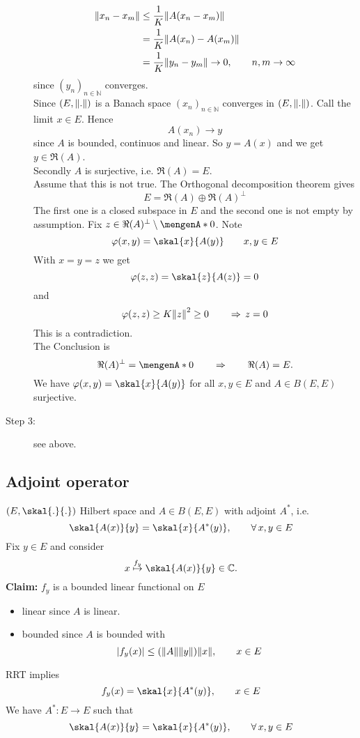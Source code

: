\begin{beweis}
\begin{description}
		\begin{align*}
			\norm{x_n-x_m} &\leq \frac{1}{K} \norm{A(x_n-x_m)} \\
			&= \frac{1}{K} \norm{A(x_n)- A(x_m)} \\
			&= \frac{1}{K} \norm{y_n -y_m} \to 0, \qquad n,m \to \infty
		\end{align*}
		since $(y_n)_{n \in \mathbb{N}}$ converges. \\
		Since $(E, \norm{.})$ is a Banach space $(x_n)_{n \in \mathbb{N}}$ converges in $(E, \norm{.})$. Call the limit $x \in E$. Hence
		\[
			A(x_n) \to y
		\]
		since $A$ is bounded, continuos and linear. So $y = A(x)$ and we get $y \in \Re(A)$. \\
		Secondly $A$ is surjective, i.e. $\Re(A)=E$. \\
		Assume that this is not true. The Orthogonal decomposition theorem gives
		\[
			E = \Re(A) \oplus \Re(A)^{\perp}
		\]
		The first one is a closed subspace in $E$ and the second one is not empty by assumption. Fix $z \in \Re(A)^{\perp} \setminus \set{0}$. Note 
		\[
			\varphi(x,y) = \skal{x}{A(y)} \qquad x,y \in E
		\]
		With $x = y = z$ we get
		\[
			\varphi(z,z) = \skal{z}{A(z)} = 0
		\]
		and 
		\[
			\varphi(z,z) \geq K \norm{z}^2 \geq 0 \qquad \Rightarrow  \,z=0
		\]
		This is a contradiction. \\
		The Conclusion is 
		\[
			\Re(A)^{\perp} = \set{0} \qquad \Rightarrow \qquad \Re(A) = E.
		\]
		We have $\varphi(x,y) = \skal{x}{A(y)}$ for all $x,y \in E$ and $A \in B(E,E)$ surjective.
		\item[Step 3:] see above.
	\end{description}
\end{beweis}

\subsection{Adjoint operator} 
\label{sub:adjoint_operator}

$(E,\skal{.}{.})$ Hilbert space and $A \in B(E,E)$ with adjoint $A^{*}$, i.e.
\[
	\skal{A(x)}{y} = \skal{x}{A^*(y)} , \qquad \forall\, x,y \in E
\]
Fix $y \in E$ and consider
\[
	x \stackrel{f_y}{\mapsto } \skal{A(x)}{y} \in \mathbb{C}. 
\]
\textbf{Claim:} \text{    }$f_y$ is a bounded linear functional on $E$
\begin{itemize}
	\item linear since $A$ is linear.
	\item bounded since $A$ is bounded with
	\[
		\abs{f_y(x)} \leq (\norm{A}\norm{y})\norm{x}, \qquad x \in E
	\]
\end{itemize}
	RRT implies
	\[
		f_y(x) = \skal{x}{A^*(y)}, \qquad x \in E
	\]
	We have $A^*: E \to E$ such that
	\[
		\skal{A(x)}{y} = \skal{x}{A^*(y)} , \qquad \forall\, x,y \in E
	\]

